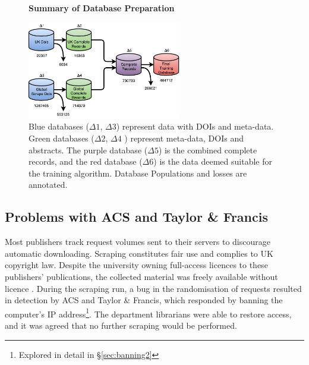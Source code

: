 \begin{figure}[H]
    \centering
    \textbf{Summary of Database Preparation}\par\medskip
    \includegraphics[width=0.6\textwidth]{Data_Acquisition/Databases2.pdf}
    \caption[Summary of Database Preparation]{Blue databases ($\Delta1$, $\Delta3$) represent data with DOIs and meta-data. Green databases ($\Delta2$, $\Delta4$ ) represent meta-data, DOIs and abstracts. The purple database ($\Delta5$) is the combined complete records, and the red database ($\Delta6$) is the data deemed suitable for the training algorithm. Database Populations and losses are annotated.}
     \label{fig:DATABASES}
\end{figure}
\newpage
\subsection{Problems with ACS and Taylor \& Francis}
\label{sec:banning1}
Most publishers track request volumes sent to their servers to discourage automatic downloading. Scraping constitutes fair use and complies to UK copyright law. Despite the university owning full-access licences to these publishers' publications, the collected material was freely available without licence \cite{thelaw}\cite{contentminelegal}. During the scraping run, a bug in the randomisation of requests resulted in detection by ACS and Taylor \& Francis, which responded by banning the computer's IP address\footnote{Explored in detail in \S\ref{sec:banning2}}. The department librarians were able to restore access, and it was agreed that no further scraping would be performed.

